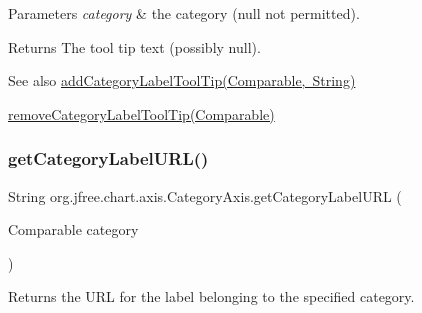 \begin{DoxyParams}{Parameters}
{\em category} & the category ({\ttfamily null} not permitted).\\
\hline
\end{DoxyParams}
\begin{DoxyReturn}{Returns}
The tool tip text (possibly {\ttfamily null}).
\end{DoxyReturn}
\begin{DoxySeeAlso}{See also}
\mbox{\hyperlink{classorg_1_1jfree_1_1chart_1_1axis_1_1_category_axis_af13a9e516099c2898e94ccc1196a105e}{add\+Category\+Label\+Tool\+Tip(\+Comparable, String)}} 

\mbox{\hyperlink{classorg_1_1jfree_1_1chart_1_1axis_1_1_category_axis_aeaffa3c7cecfeacf63ef280d29216bbd}{remove\+Category\+Label\+Tool\+Tip(\+Comparable)}} 
\end{DoxySeeAlso}
\mbox{\label{classorg_1_1jfree_1_1chart_1_1axis_1_1_category_axis_ae0e6190663aa8502333afbc11492e72b}} 
\subsubsection{\texorpdfstring{get\+Category\+Label\+U\+R\+L()}{getCategoryLabelURL()}}
{\footnotesize\ttfamily String org.\+jfree.\+chart.\+axis.\+Category\+Axis.\+get\+Category\+Label\+U\+RL (\begin{DoxyParamCaption}\item[{Comparable}]{category }\end{DoxyParamCaption})}

Returns the U\+RL for the label belonging to the specified category.



